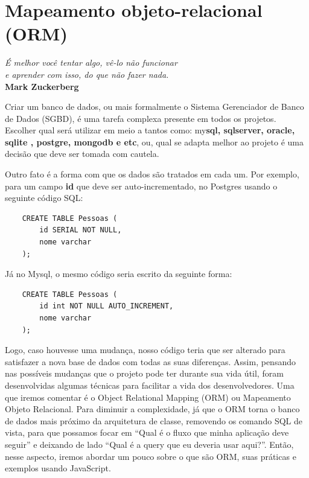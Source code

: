 \chapter{Mapeamento objeto-relacional (ORM)}\label{cap:cap3}

\begin{flushright}
	\textit{
		É melhor você tentar algo, vê-lo não funcionar \\ e aprender com isso, do que não fazer nada.
	} \\
	
	\textbf{Mark Zuckerberg}
\end{flushright}

Criar um banco de dados, ou mais formalmente o Sistema Gerenciador de Banco de Dados (SGBD), é uma tarefa complexa presente em todos os projetos. Escolher qual será utilizar em meio a tantos como: my\textbf{sql, sqlserver, oracle, sqlite , postgre, mongodb e etc}, ou, qual se adapta melhor ao projeto é uma decisão que deve ser tomada com cautela.

Outro fato é a forma com que os dados são tratados em cada um. Por exemplo, para um campo \textbf{id} que deve ser auto-incrementado, no Postgres usando o seguinte código SQL:

\begin{verbatim}
	CREATE TABLE Pessoas (
		id SERIAL NOT NULL,
		nome varchar
	);
\end{verbatim}

Já no Mysql, o mesmo código seria escrito da seguinte forma:

\begin{verbatim}
	CREATE TABLE Pessoas (
		id int NOT NULL AUTO_INCREMENT,
		nome varchar
	);
\end{verbatim}

Logo, caso houvesse uma mudança, nosso código teria que ser alterado para satisfazer a nova base de dados com todas as suas diferenças. Assim, pensando nas possíveis mudanças que o projeto pode ter durante sua vida útil, foram desenvolvidas algumas técnicas para facilitar a vida dos desenvolvedores. Uma que iremos comentar é o Object Relational Mapping (ORM) ou Mapeamento Objeto Relacional. Para diminuir a complexidade, já que o ORM torna o banco de dados mais próximo da arquitetura de classe, removendo os comando SQL de vista, para que possamos focar em ``Qual é o fluxo que minha aplicação deve seguir'' e deixando de lado ``Qual é a query que eu deveria usar aqui?''. Então, nesse aspecto, iremos abordar um pouco sobre o que são ORM, suas práticas e exemplos usando JavaScript.

